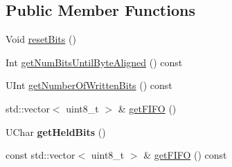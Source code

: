 \subsection*{Public Member Functions}
\begin{DoxyCompactItemize}
\item 
Void \hyperlink{class_t_com_output_bitstream_ae7470ca7d0deab9c5f7c327e17f0bce0}{reset\+Bits} ()
\item 
Int \hyperlink{class_t_com_output_bitstream_a1c5b3ca146b4c2828f2fde6a89bd8bf1}{get\+Num\+Bits\+Until\+Byte\+Aligned} () const
\item 
U\+Int \hyperlink{class_t_com_output_bitstream_a6adef3de1456ef6b024fcd432aa781fc}{get\+Number\+Of\+Written\+Bits} () const
\item 
std\+::vector$<$ uint8\+\_\+t $>$ \& \hyperlink{class_t_com_output_bitstream_aba619d657e7772f3736a15d4d03706d6}{get\+F\+I\+FO} ()
\item 
\mbox{\label{class_t_com_output_bitstream_a66bda207843363df540fbcd2167f567e}} 
U\+Char {\bfseries get\+Held\+Bits} ()
\item 
const std\+::vector$<$ uint8\+\_\+t $>$ \& \hyperlink{class_t_com_output_bitstream_a9b50f1e205ae3927803142d5cf74932c}{get\+F\+I\+FO} () const
\end{DoxyCompactItemize}
{\bf }\par
